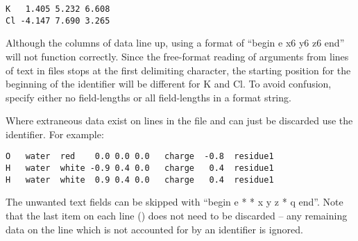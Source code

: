 \begin{verbatim}
K   1.405 5.232 6.608
Cl -4.147 7.690 3.265
\end{verbatim}

Although the columns of data line up, using a format of ``begin e x6 y6 z6 end'' will not function correctly. Since the free-format reading of arguments from lines of text in files stops at the first delimiting character, the starting position for the beginning of the  identifier will be different for K and Cl. To avoid confusion, specify either no field-lengths or all field-lengths in a format string.

Where extraneous data exist on lines in the file and can just be discarded use the \qte{*} identifier. For example:

\begin{verbatim}
O   water  red    0.0 0.0 0.0   charge  -0.8  residue1
H   water  white -0.9 0.4 0.0   charge   0.4  residue1
H   water  white  0.9 0.4 0.0   charge   0.4  residue1
\end{verbatim}

The unwanted text fields can be skipped with ``begin e * * x y z * q end''. Note that the last item on each line () does not need to be discarded -- any remaining data on the line which is not accounted for by an identifier is ignored.


